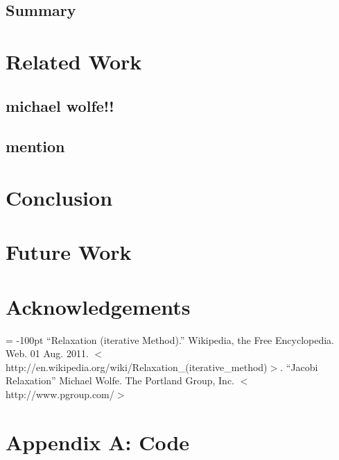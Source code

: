 \documentclass[10pt]{article}
\begin{document}
\begin{multicols}{2}
\subsection{Summary} %

\section{Related Work} %
    \subsection{michael wolfe!!}
    \subsection{mention} %

\section{Conclusion} %

\section{Future Work} %
\section{Acknowledgements} %
\begin{flushleft}
\begin{thebibliography}{99}
\topmargin = -100pt
    ``Relaxation (iterative Method).''
        Wikipedia, the Free Encyclopedia. Web. 01 Aug. 2011. $<$http://en.wikipedia.org/wiki/Relaxation\_(iterative\_method)$>$.
    ``Jacobi Relaxation''
        Michael Wolfe. The Portland Group, Inc. $<$http://www.pgroup.com/$>$
\end{thebibliography}
\end{flushleft}

\clearpage

\end{multicols}

\section{Appendix A: Code}
\end{document}
